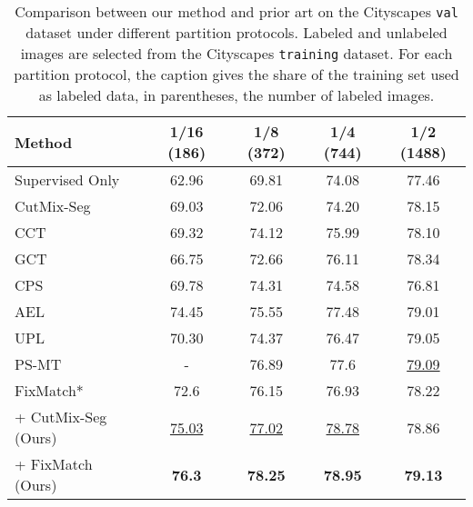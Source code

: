 \documentclass{article}
\renewcommand{\cite}[1]{\citep{#1}}
\begin{document}
\begin{table}\centering
\caption{
Comparison between our method and prior art on the Cityscapes \texttt{val} dataset under different partition protocols. 
Labeled and unlabeled images are selected from the Cityscapes \texttt{training} dataset. 
For each partition protocol, the caption gives the share of the training set used as labeled data, in parentheses, the  number of labeled images.
}
\label{tab:city_fix}
\begin{tabular}{lcccc}
\toprule
\textbf{Method} & 
\textbf{1/16 (186)} & \textbf{1/8 (372)} & \textbf{1/4 (744)} & \textbf{1/2 (1488)} \\
\midrule
Supervised Only & 
62.96 & 69.81 & 74.08 & 77.46 \\
\midrule
CutMix-Seg \cite{french2019semi} & 
69.03 & 72.06 & 74.20 & 78.15 \\
CCT \cite{cct} & 
69.32 & 74.12 & 75.99 & 78.10 \\
GCT \cite{gct} &
66.75 & 72.66 & 76.11 & 78.34 \\
CPS \cite{cps} &
69.78 & 74.31 & 74.58 & 76.81 \\
AEL \cite{ael}  &
74.45 & 75.55 & 77.48 & 79.01 \\
UPL \cite{wang2022semi}  &
70.30 & 74.37  & 76.47  & 79.05  \\
PS-MT \cite{psmt}  &
- & 76.89  & 77.6  & \underline{79.09} \\
FixMatch* \cite{Rabadan2022DenseFA}  &
72.6 &  76.15  & 76.93  & 78.22 \\





\midrule
\methodname{} + CutMix-Seg (Ours) &
\underline{75.03}  & 
\underline{77.02}   & 
\underline{78.78}  & 
78.86  \\
\methodname{} + FixMatch (Ours) &
\textbf{76.3}  & 
\textbf{78.25}   & 
\textbf{78.95}  & 
\textbf{79.13}  \\
\bottomrule
\end{tabular}
\end{table}
\fi
 
\end{document}
